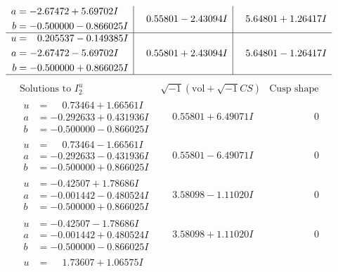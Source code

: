 \documentclass[1p]{elsarticle_modified}
\theoremstyle{definition}
\newcommand{\I}{\sqrt{-1}}
\begin{document}
$$\begin{array}{c|c|c}
\begin{aligned}
a &= -2.67472 + 5.69702 I \\
b &= -0.500000 - 0.866025 I\end{aligned}
 & \phantom{-}0.55801 - 2.43094 I & \phantom{-}5.64801 + 1.26417 I \\ \hline\begin{aligned}
u &= \phantom{-}0.205537 - 0.149385 I \\
a &= -2.67472 - 5.69702 I \\
b &= -0.500000 + 0.866025 I\end{aligned}
 & \phantom{-}0.55801 + 2.43094 I & \phantom{-}5.64801 - 1.26417 I\\
 \hline 
 \end{array}$$\newpage$$\begin{array}{c|c|c}  
\text{Solutions to }I^u_{2}& \I (\text{vol} + \sqrt{-1}CS) & \text{Cusp shape}\\
 \hline 
\begin{aligned}
u &= \phantom{-}0.73464 + 1.66561 I \\
a &= -0.292633 + 0.431936 I \\
b &= -0.500000 - 0.866025 I\end{aligned}
 & \phantom{-}0.55801 + 6.49071 I & \phantom{-0.000000 } 0 \\ \hline\begin{aligned}
u &= \phantom{-}0.73464 - 1.66561 I \\
a &= -0.292633 - 0.431936 I \\
b &= -0.500000 + 0.866025 I\end{aligned}
 & \phantom{-}0.55801 - 6.49071 I & \phantom{-0.000000 } 0 \\ \hline\begin{aligned}
u &= -0.42507 + 1.78686 I \\
a &= -0.001442 - 0.480524 I \\
b &= -0.500000 + 0.866025 I\end{aligned}
 & \phantom{-}3.58098 - 1.11020 I & \phantom{-0.000000 } 0 \\ \hline\begin{aligned}
u &= -0.42507 - 1.78686 I \\
a &= -0.001442 + 0.480524 I \\
b &= -0.500000 - 0.866025 I\end{aligned}
 & \phantom{-}3.58098 + 1.11020 I & \phantom{-0.000000 } 0 \\ \hline\begin{aligned}
u &= \phantom{-}1.73607 + 1.06575 I \\

\end{aligned}
\end{array}$$
\end{document}
